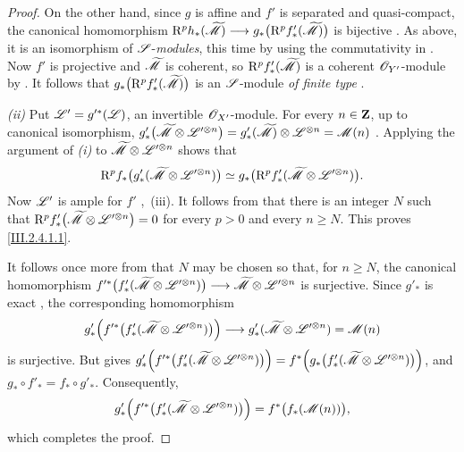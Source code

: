 \begin{proof}
On the other hand, since $g$ is affine and $f'$ is separated and quasi-compact, the canonical homomorphism $\mathrm{R}^p h_*(\widetilde{\mathscr{M}})
\longrightarrow
g_*\bigl(\mathrm{R}^p f'_*(\widetilde{\mathscr{M}})\bigr)$
is bijective .
As above, it is an isomorphism of $\mathscr{S}$-\emph{modules}, this time by using the commutativity in .
Now $f'$ is projective and $\widetilde{\mathscr{M}}$ is coherent, so $\mathrm{R}^p f'_*(\widetilde{\mathscr{M}})$ is a coherent $\mathscr{O}_{Y'}$-module by .
It follows that $g_*\bigl(\mathrm{R}^p f'_*(\widetilde{\mathscr{M}})\bigr)$
is an $\mathscr{S}$-module \emph{of finite type} .

\emph{(ii)} Put $\mathscr{L}'=g'^*(\mathscr{L})$,
an invertible $\mathscr{O}_{X'}$-module.
For every $n\in\mathbf{Z}$, up to canonical isomorphism, $g'_*\bigl(\widetilde{\mathscr{M}}\otimes\mathscr{L}'^{\otimes n}\bigr)
=
g'_*(\widetilde{\mathscr{M}})\otimes\mathscr{L}^{\otimes n}
=
\mathscr{M}(n)$
.
Applying the argument of \emph{(i)} to $\widetilde{\mathscr{M}}\otimes\mathscr{L}'^{\otimes n}$
shows that
\[
  \mathrm{R}^p f_*
  \bigl(g'_*(\widetilde{\mathscr{M}}\otimes\mathscr{L}'^{\otimes n})\bigr)
  \simeq
  g_*\bigl(\mathrm{R}^p f'_*
  (\widetilde{\mathscr{M}}\otimes\mathscr{L}'^{\otimes n})\bigr).
\]
Now $\mathscr{L}'$ is ample for $f'$ ,~(iii).
It follows from  that there is an integer $N$ such that $\mathrm{R}^p f'_*
\bigl(\widetilde{\mathscr{M}}\otimes\mathscr{L}'^{\otimes n}\bigr)=0$
for every $p>0$ and every $n\geq N$.
This proves \eqref{III.2.4.1.1}.

It follows once more from  that $N$ may be chosen so that, for $n\geq N$, the canonical homomorphism $f'^*\bigl(f'_*(\widetilde{\mathscr{M}}\otimes\mathscr{L}'^{\otimes n})\bigr)
\longrightarrow
\widetilde{\mathscr{M}}\otimes\mathscr{L}'^{\otimes n}$
is surjective.
Since $g'_*$ is exact , the corresponding homomorphism
\[
  g'_*\Bigl(
    f'^*\bigl(f'_*(\widetilde{\mathscr{M}}\otimes\mathscr{L}'^{\otimes n})\bigr)
  \Bigr)
  \longrightarrow
  g'_*(\widetilde{\mathscr{M}}\otimes\mathscr{L}'^{\otimes n})
  =\mathscr{M}(n)
\]
is surjective.
But  gives $g'_*\Bigl(
f'^*\bigl(f'_*(\widetilde{\mathscr{M}}\otimes\mathscr{L}'^{\otimes n})\bigr)
\Bigr)
=
f^*\Bigl(
g_*\bigl(f'_*(\widetilde{\mathscr{M}}\otimes\mathscr{L}'^{\otimes n})\bigr)
\Bigr)$,
and $g_*\circ f'_*=f_*\circ g'_*$.
Consequently,
\[
  g'_*\Bigl(
    f'^*\bigl(f'_*(\widetilde{\mathscr{M}}\otimes\mathscr{L}'^{\otimes n})\bigr)
  \Bigr)
  =
  f^*\bigl(f_*(\mathscr{M}(n))\bigr),
\]
which completes the proof.
\end{proof}


